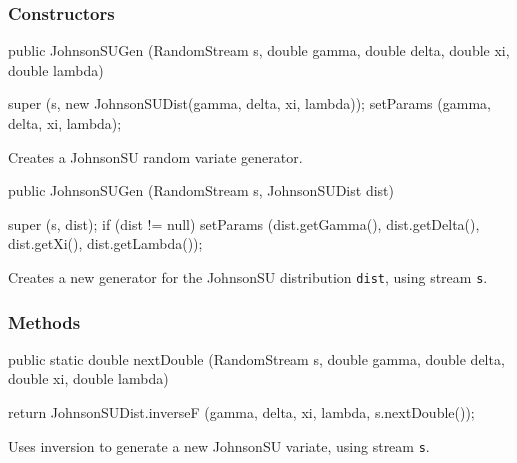 \subsubsection* {Constructors}
\begin{code}

   public JohnsonSUGen (RandomStream s, double gamma, double delta,
                        double xi, double lambda) \begin{hide} {
      super (s, new JohnsonSUDist(gamma, delta, xi, lambda));
      setParams (gamma, delta, xi, lambda);
   }\end{hide}
\end{code}
\begin{tabb} Creates a JohnsonSU random variate generator.
\end{tabb}
\begin{code}

   public JohnsonSUGen (RandomStream s, JohnsonSUDist dist) \begin{hide} {
      super (s, dist);
      if (dist != null)
         setParams (dist.getGamma(), dist.getDelta(), dist.getXi(),
                    dist.getLambda());
   } \end{hide}
\end{code}
 \begin{tabb}  Creates a new generator for the JohnsonSU
   distribution \texttt{dist}, using stream \texttt{s}.
 \end{tabb}

\subsubsection* {Methods}
\begin{code}

   public static double nextDouble (RandomStream s, double gamma,
                                    double delta, double xi, double lambda) \begin{hide} {
      return JohnsonSUDist.inverseF (gamma, delta, xi, lambda,
                                        s.nextDouble());
   }\end{hide}
\end{code}
 \begin{tabb}  Uses inversion to generate a new JohnsonSU variate,
   using stream \texttt{s}.
 \end{tabb}
\begin{hide}
\begin{code}
}\end{code}
\end{hide}

